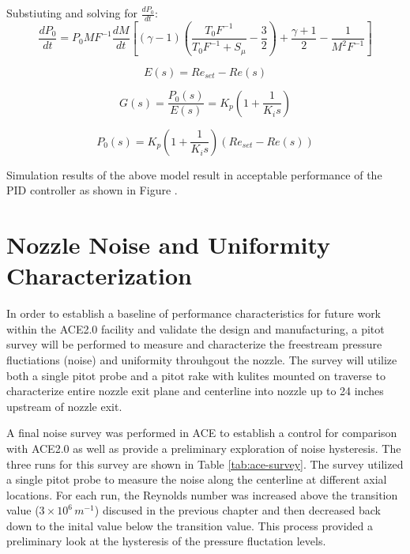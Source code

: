 Substiuting and solving for $\frac{dP_0}{dt}$:
\begin{equation}
    \frac{dP_0}{dt} = P_0 M F^{-1} \frac{dM}{dt} \left[ (\gamma-1) \left( \frac{T_0 F^{-1}}{T_0 F^{-1} + S_\mu} - \frac{3}{2} \right) + \frac{\gamma+1}{2} - \frac{1}{M^2 F^{-1}} \right]
\end{equation}

\begin{equation}
    E(s) = Re_{set} - Re(s)
\end{equation}

\begin{equation}
    G(s) = \frac{P_0(s)}{E(s)} = K_p \left(1 + \frac{1}{K_i s}\right)
\end{equation}

\begin{equation}
    P_0(s) = K_p \left(1 + \frac{1}{K_i s}\right) \left(Re_{set} - Re(s)\right)
\end{equation}

Simulation results of the above model result in acceptable performance of the PID controller as shown in Figure .

\section{Nozzle Noise and Uniformity Characterization}

In order to establish a baseline of performance characteristics for future work within the ACE2.0 facility and validate the design and manufacturing, a pitot survey will be performed to measure and characterize the freestream pressure fluctiations (noise) and uniformity throuhgout the nozzle. The survey will utilize both a single pitot probe and a pitot rake with kulites mounted on traverse to characterize entire nozzle exit plane and centerline into nozzle up to 24 inches upstream of nozzle exit.

A final noise survey was performed in ACE to establish a control for comparison with ACE2.0 as well as provide a preliminary exploration of noise hysteresis. The three runs for this survey are shown in Table \ref{tab:ace-survey}. The survey utilized a single pitot probe to measure the noise along the centerline at different axial locations. For each run, the Reynolds number was increased above the transition value ($3 \times 10^6 \, m^{-1}$) discused in the previous chapter and then decreased back down to the inital value below the transition value. This process provided a preliminary look at the hysteresis of the pressure fluctation levels.

